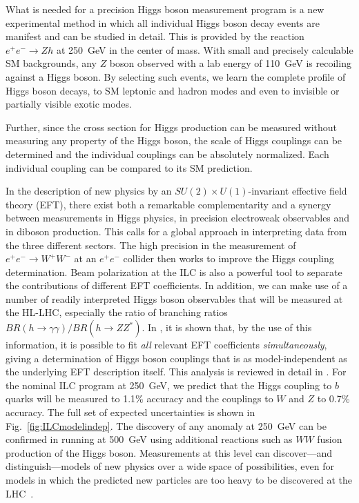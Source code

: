 \documentclass[%
 reprint,
 amsmath,amssymb,
 aps,
]{revtex4-1}
\def\ee{e^+e^-}
\begin{document}
What is needed for a precision Higgs boson measurement program
is a new experimental method in which all individual Higgs boson decay events
are manifest
and can be studied in detail.   This is provided by the reaction
$\ee\to Zh$ at 250~GeV in the center of mass.
  With small and precisely calculable SM backgrounds, any $Z$ boson
  observed with a lab energy of 110~GeV is recoiling against a Higgs
  boson.  By selecting such events, we learn the complete profile of Higgs boson  decays, to SM leptonic and hadron modes and even to invisible or
  partially visible exotic modes. 

Further, since the cross section for Higgs production can be measured
without measuring any property of the Higgs boson, the scale of Higgs
couplings can be determined and the individual couplings can be
absolutely normalized.  Each individual coupling can be compared to
its SM prediction.

In the description of new physics by an $SU(2)\times U(1)$-invariant effective field theory (EFT), there exist both a remarkable complementarity and a synergy between measurements in Higgs physics, in precision electroweak observables and in diboson production. This calls for a global approach in interpreting data from the three different sectors. The high precision in  the measurement of $e^+e^- \to W^+W^-$ at an $e^+e^-$ collider then works to improve the Higgs coupling determination. Beam polarization at the ILC is also a powerful tool
to separate the contributions of different EFT
coefficients.  In addition, we can make use of a number of readily interpreted Higgs boson observables that will be measured at the HL-LHC, especially the 
ratio of branching ratios  $BR(h\to \gamma\gamma)/BR(h\to ZZ^*)$. 
  In \cite{Barklow:2017suo}, it is shown that, by the use of this information, 
  it is possible to fit {\it all}
relevant EFT
coefficients  {\it simultaneously}, giving a 
determination of Higgs boson couplings that is as
model-independent as the underlying EFT description itself. 
 This analysis is reviewed in detail in  \cite{ILCforESS}. 
For the nominal ILC program at 250~GeV, we predict that the Higgs
coupling to $b$ quarks will be measured to 1.1\% accuracy and the
couplings to $W$ and $Z$ to 0.7\% accuracy.  The full set  of  expected
uncertainties  is shown in Fig.~\ref{fig:ILCmodelindep}.    The 
discovery of any anomaly at 250~GeV can be confirmed in running at
500~GeV 
using additional reactions  such as $WW$ fusion production of the
Higgs boson.   Measurements at this
level can discover---and distinguish---models of new physics over a
wide space of possibilities, even for models in which the predicted new
particles are too heavy to be discovered at the
LHC~\cite{Barklow:2017suo}.
\end{document}
